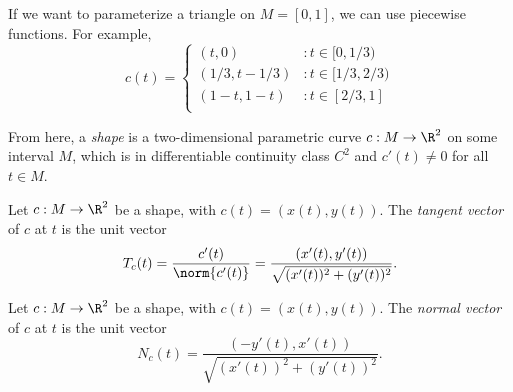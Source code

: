 \documentclass[12pt]{article}
\begin{document}
\begin{exmp}
    If we want to parameterize a triangle on $M = [0, 1]$, we can use piecewise functions. For example,
    \[c(t) = \left\{
        \begin{array}{ll}
          (t, 0) & : t \in [0, 1/3)\\
          (1/3, t - 1/3) & : t \in [1/3, 2/3)\\
          (1 - t, 1 - t) & : t \in [2/3, 1]\\
        \end{array}
      \right.
    \]
\end{exmp}

\begin{defn}
    From here, a \emph{shape} is a two-dimensional parametric curve $c: M \to \R^2$ on some interval $M$, which is in differentiable continuity class $C^2$ and $c'(t) \neq 0$ for all $t \in M$.
\end{defn}

\begin{defn}
    Let $c: M \to \R^2$ be a shape, with $c(t) = (x(t), y(t))$. The \emph{tangent vector} of $c$ at $t$ is the unit vector \[T_c(t) = \frac{c'(t)}{\norm{c'(t)}} = \frac{(x'(t), y'(t))}{\sqrt{(x'(t))^2 + (y'(t))^2}}.\]
\end{defn}

\begin{defn}
    Let $c: M \to \R^2$ be a shape, with $c(t) = (x(t), y(t))$. The \emph{normal vector} of $c$ at $t$ is the unit vector \[N_c(t) = \frac{(-y'(t), x'(t))}{\sqrt{(x'(t))^2 + (y'(t))^2}}.\]
\end{defn}
\end{document}
